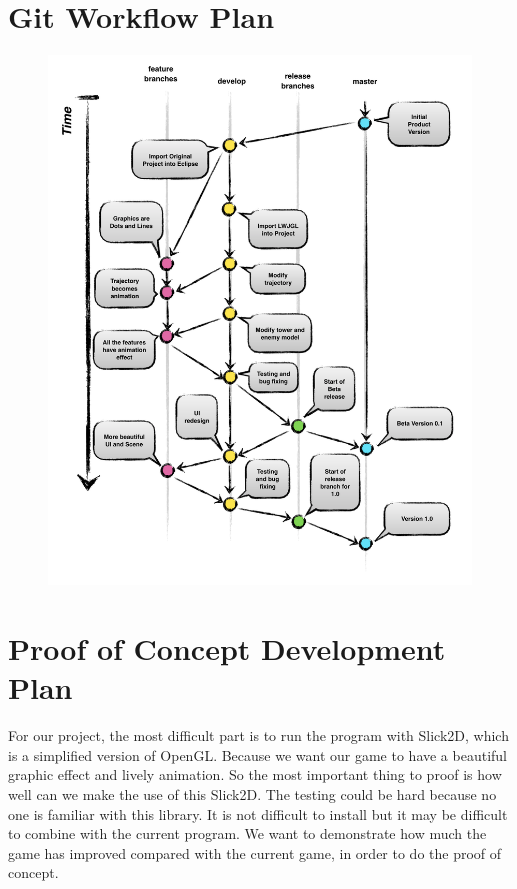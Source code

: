\documentclass[12pt]{article}
\begin{document}
\section{Git Workflow Plan}
\begin{figure}
\centering
\includegraphics[width=16cm]{img/GitWorkflow.png}
\end{figure}
\newpage

\section{Proof of Concept Development Plan}
For our project, the most difficult part is to run the program with \color{red}Slick2D, which is a simplified version of OpenGL\color{black}. Because we want our game to have a beautiful graphic effect and lively animation. So the most important thing to proof is how well can we make the use of this \color{red}Slick2D\color{black}. The testing could be hard because no one is familiar with this library. It is not difficult to install but it may be difficult to combine with the current program. We want to demonstrate how much the game has improved compared with the current game, in order to do the proof of concept.
\end{document}

